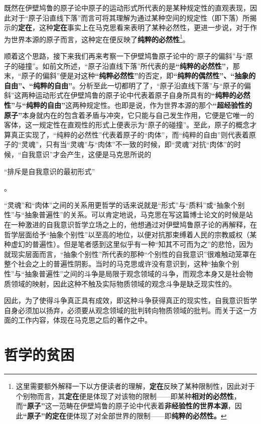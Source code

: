 \documentclass[a4paper,twoside,12pt,AutoFakeBold]{ctexart}
\begin{document}
既然在伊壁鸠鲁的原子论中原子的运动形式所代表的是某种规定性的直观表现，因此对于“原子沿直线下落”而言可将其理解为通过某种空间的规定性（即下落）所揭示的\textbf{定在}，这种\textbf{定在}事实上在马克思看来表明了某种必然性，更进一步说，对于作为世界本源的原子而言，这种定在便反映了\textbf{纯粹的必然性}\footnote{这里需要额外解释一下以方便读者的理解，\textbf{定在}反映了某种限制性，因此对于个别物而言，其\textbf{定在}便是体现了对该物的限制——即某种\textbf{相对的必然性}，而\textbf{“原子”}这一范畴在伊壁鸠鲁的原子论中代表着\textbf{非经验性的世界本源}，因此\textbf{“原子”的定在}便体现了对全部世界的限制——即\textbf{纯粹的必然性。}}。

顺着这个思路，接下来我们再来考察一下伊壁鸠鲁原子论中的“原子的偏斜”与“原子的碰撞”。如前文所述，“原子沿直线下落”所代表的是\textbf{“纯粹的必然性”}，那末，“原子的偏斜”便是对这种\textbf{“纯粹必然性”}的否定，即\textbf{“纯粹的偶然性”、“抽象的自由”、“纯粹的自由”}。分析至此一切都明了了，“原子沿直线下落”与“原子的偏斜”这两种运动形式在伊壁鸠鲁的原子论中代表着原子自身所具有的\textbf{“纯粹的必然性”}与\textbf{“纯粹的自由”}这两种规定性。也即是说，作为世界本源的那个\textbf{“超经验性的原子”}本身就内在的包含着矛盾与冲突，它只能与自己发生作用，它便是它唯一的客体，这一规定性在直观性的形式上便表示为“原子的碰撞”。至此，原子的概念才算真正实现了，“纯粹的必然性”代表着原子的“肉体”，而“纯粹的自由”则代表着原子的“灵魂”，只有当“灵魂”与“肉体”不一致的时候，即“灵魂”对抗“肉体”的时候，“自我意识”才会产生，这便是马克思所说的\begin{fangsong}“排斥是自我意识的最初形式”    \end{fangsong}。

“灵魂”和“肉体”之间的关系用更哲学的话来说就是“形式”与“质料”或“抽象个别性”与“抽象普遍性”的关系。可以肯定地说，马克思在写这篇博士论文的时候是站在一种激进的自我意识哲学立场之上的，他想通过对伊壁鸠鲁原子论的再解释，在哲学层面给予“抽象个别性”以至高的地位，以便对抗那束缚着人民的宗教威权（某种虚幻的普遍性）。但是笔者感到这里似乎有一种“知其不可而为之”的悲怆，因为就现实层面而言，“抽象个别性”所代表的那种“个别性的自我意识”很难触动笼罩在整个社会之上的普遍性阴影。当时的马克思或许没有意识到，这种“抽象个别性”与“抽象普遍性”之间的斗争是局限于观念领域的斗争，而观念本身又是社会物质领域的映射，因此这种不触及实际物质领域的观念斗争是缺乏现实性的。

因此，为了使得斗争真正具有成效，即这种斗争获得真正的现实性，自我意识哲学自身必须加以扬弃，必须要从观念领域的批判转向物质领域的批判。而关于这一方面的工作内容，体现在马克思之后的著作之中。
\newpage
\section{哲学的贫困}
\end{document}
